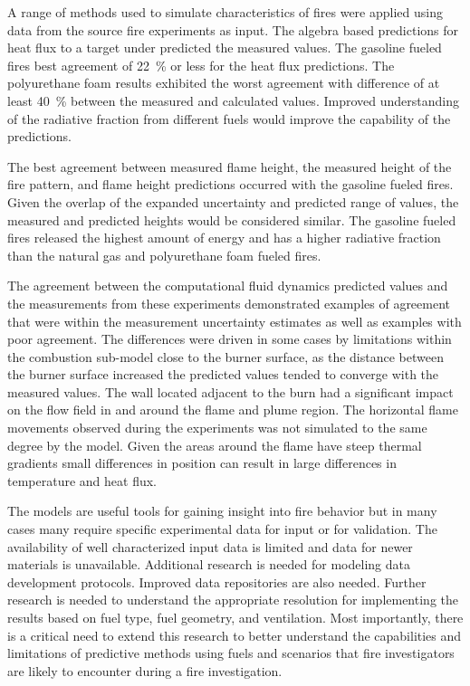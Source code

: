 \documentclass[twoside]{uocthesis}
\begin{document}
{A range of methods used to simulate characteristics of fires were applied using data from the source fire experiments as input.  The algebra based predictions for heat flux to a target under predicted the measured values.  The gasoline fueled fires best agreement of 22~\% or less for the heat flux predictions.  The polyurethane foam results exhibited the worst agreement with difference of at least 40~\% between the measured and calculated values.  Improved understanding of the radiative fraction from different fuels would improve the capability of the predictions.  

The best agreement between measured flame height, the measured height of the fire pattern, and flame height predictions occurred with the gasoline fueled fires.  Given the overlap of the expanded uncertainty and predicted range of values, the measured and predicted heights would be considered similar.  The gasoline fueled fires released the highest amount of energy and has a higher radiative fraction than the natural gas and polyurethane foam fueled fires.  

The agreement between the computational fluid dynamics predicted values and the measurements from these experiments demonstrated examples of agreement that were within the measurement uncertainty estimates as well as examples with poor agreement.  The differences were driven in some cases by limitations within the combustion sub-model close to the burner surface, as the distance between the burner surface increased the predicted values tended to converge with the measured values.  The wall located adjacent to the burn had a significant impact on the flow field in and around the flame and plume region.  The horizontal flame movements observed during the experiments was not simulated to the same degree by the model.  Given the areas around the flame have steep thermal gradients small differences in position can result in large differences in temperature and heat flux.      

The models are useful tools for gaining insight into fire behavior but in many cases many require specific experimental data for input or for validation. The availability   of well characterized input data is limited and data for newer materials is unavailable. Additional research is needed for modeling data development protocols.  Improved data repositories are also needed. Further research is needed to understand the appropriate resolution for implementing the results based on fuel type, fuel geometry, and ventilation.  Most importantly, there is a critical need to extend this research to better understand the capabilities and limitations of predictive methods using fuels and scenarios that fire investigators are likely to encounter during a fire investigation.  
}
\end{document}
